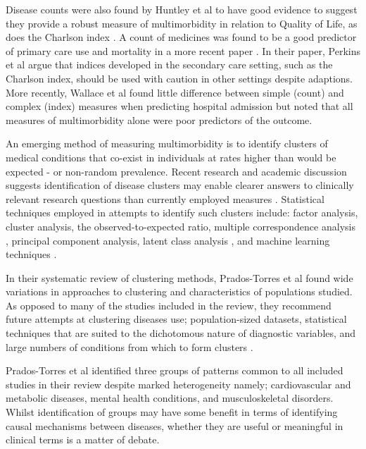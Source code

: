 \documentclass[12pt,]{report}
\begin{document}
Disease counts were also found by Huntley et al \citeyearpar{RN29} to
have good evidence to suggest they provide a robust measure of
multimorbidity in relation to Quality of Life, as does the Charlson
index \citep{RN339}. A count of medicines was found to be a good
predictor of primary care use and mortality in a more recent paper
\citep{RN247}. In their paper, Perkins et al \citeyearpar{RN78} argue
that indices developed in the secondary care setting, such as the
Charlson index, should be used with caution in other settings despite
adaptions. More recently, Wallace et al \citeyearpar{RN228} found little
difference between simple (count) and complex (index) measures when
predicting hospital admission but noted that all measures of
multimorbidity alone were poor predictors of the outcome.

An emerging method of measuring multimorbidity is to identify clusters
of medical conditions that co-exist in individuals at rates higher than
would be expected - or non-random prevalence. Recent research and
academic discussion suggests identification of disease clusters may
enable clearer answers to clinically relevant research questions than
currently employed measures
\citetext{\citealp{RN96}; \citealp[RN109;][]{RN98}; \citealp{RN99}; \citealp{RN188}; \citealp{RN31}; \citealp{RN64}}.
Statistical techniques employed in attempts to identify such clusters
include: factor analysis, cluster analysis, the observed-to-expected
ratio, multiple correspondence analysis \citep{RN98, RN301}, principal
component analysis, latent class analysis \citep{RN109, RN365}, and
machine learning techniques \citep{RN273}.

In their systematic review of clustering methods, Prados-Torres et al
\citeyearpar{RN98} found wide variations in approaches to clustering and
characteristics of populations studied. As opposed to many of the
studies included in the review, they recommend future attempts at
clustering diseases use; population-sized datasets, statistical
techniques that are suited to the dichotomous nature of diagnostic
variables, and large numbers of conditions from which to form clusters
\citep{RN98}.

Prados-Torres et al \citeyearpar{RN98} identified three groups of
patterns common to all included studies in their review despite marked
heterogeneity namely; cardiovascular and metabolic diseases, mental
health conditions, and musculoskeletal disorders. Whilst identification
of groups may have some benefit in terms of identifying causal
mechanisms between diseases, whether they are useful or meaningful in
clinical terms is a matter of debate.
\end{document}
